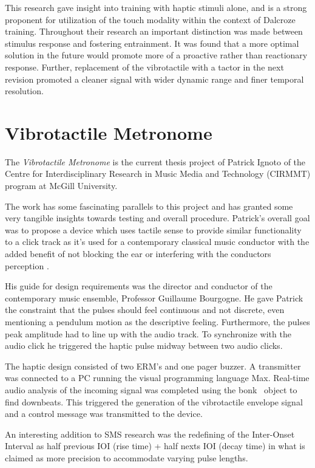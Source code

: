 This research gave insight into training with haptic stimuli alone, and is a strong proponent for utilization of the touch modality within the context of Dalcroze training. Throughout their research an important distinction was made between stimulus response and fostering entrainment. It was found that a more optimal solution in the future would promote more of a proactive rather than reactionary response. Further, replacement of the vibrotactile with a tactor in the next revision promoted a cleaner signal with wider dynamic range and finer temporal resolution.

\section{Vibrotactile Metronome} \label{vibrotactileMetronome}
The \textit{Vibrotactile Metronome} is the current thesis project of Patrick Ignoto of the Centre for Interdisciplinary Research in Music Media and Technology (CIRMMT) program at McGill University.

The work has some fascinating parallels to this project and has granted some very tangible insights towards testing and overall procedure. Patrick’s overall goal was to propose a device which uses tactile sense to provide similar functionality to a click track as it’s used for a contemporary classical music conductor with the added benefit of not blocking the ear or interfering with the conductors perception \cite{ignoto2017development}.

His guide for design requirements was the director and conductor of the contemporary music ensemble, Professor Guillaume Bourgogne. He gave Patrick the constraint that the pulses should feel continuous and not discrete, even mentioning a pendulum motion as the descriptive feeling. Furthermore, the pulses peak amplitude had to line up with the audio track. To synchronize with the audio click he triggered the haptic pulse midway between two audio clicks.

The haptic design consisted of two ERM’s and one pager buzzer. A transmitter was connected to a PC running the visual programming language Max. Real-time audio analysis of the incoming signal was completed using the bonk~ object to find downbeats. This triggered the generation of the vibrotactile envelope signal and a control message was transmitted to the device.

An interesting addition to SMS research was the redefining of the Inter-Onset Interval as half previous IOI (rise time) + half nexts IOI (decay time) in what is claimed as more precision to accommodate varying pulse lengths.

